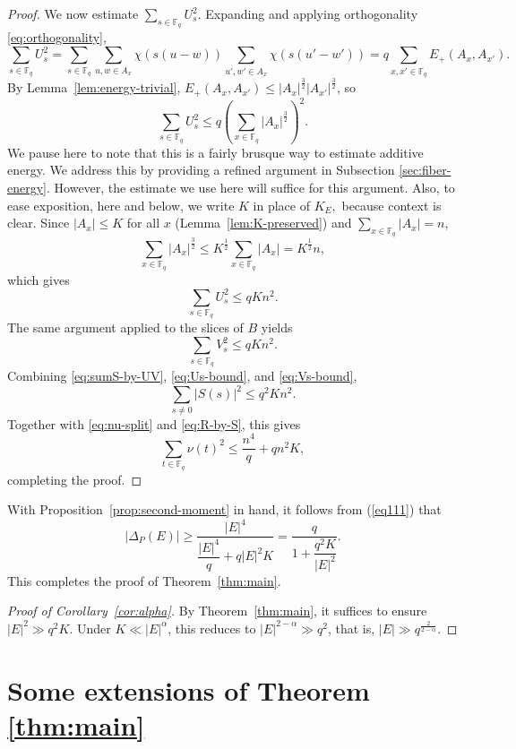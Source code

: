 \documentclass{article}
\newcommand{\F}{\mathbb{F}}
\newcommand{\1}{\mathbf{1}}
\begin{document}
\begin{proof}
We now estimate $\sum\limits_{s\in \F_q} U_s^2$. Expanding and applying orthogonality \eqref{eq:orthogonality},
\[
\sum_{s\in\F_q}U_s^2
=
\sum_{s\in\mathbb F_q}\sum_{u,w\in A_x}\chi(s(u-w))\sum_{u',w'\in A_x}\chi(s(u'-w'))
=
q\sum_{x,x'\in\F_q}E_+(A_x,A_{x'}).
\]
By Lemma~\ref{lem:energy-trivial}, $E_+(A_x,A_{x'})\le|A_x|^{\frac{3}{2}}|A_{x'}|^{\frac{3}{2}}$, so
\[
\sum_{s\in\F_q}U_s^2
\le
q\left(\sum_{x\in\F_q}|A_x|^{\frac{3}{2}}\right)^2.
\]
We pause here to note that this is a fairly brusque way to estimate additive energy. We address this by providing a refined argument in Subsection \ref{sec:fiber-energy}. However, the estimate we use here will suffice for this argument. Also, to ease exposition, here and below, we write $K$ in place of $K_E,$ because context is clear. Since $|A_x|\le K$ for all $x$ (Lemma~\ref{lem:K-preserved}) and $\sum\limits_{x\in\F_q}|A_x|=n$,
\[
\sum_{x\in\F_q}|A_x|^{\frac{3}{2}}\le K^{\frac{1}{2}}\sum_{x\in\F_q}|A_x|=K^{\frac{1}{2}}n,
\]
which gives
\begin{equation}\label{eq:Us-bound}
\sum_{s\in\F_q}U_s^2\le qKn^2.
\end{equation}
The same argument applied to the slices of $B$ yields
\begin{equation}\label{eq:Vs-bound}
\sum_{s\in\F_q}V_s^2\le qKn^2.
\end{equation}
Combining \eqref{eq:sumS-by-UV}, \eqref{eq:Us-bound}, and \eqref{eq:Vs-bound},
\[
\sum_{s\ne 0}|S(s)|^2\le q^2Kn^2.
\]
Together with \eqref{eq:nu-split} and \eqref{eq:R-by-S}, this gives
\[
\sum_{t\in \F_q}\nu(t)^2
\le
\frac{n^4}{q}+qn^2K,
\]
completing the proof.
\end{proof}
With Proposition~\ref{prop:second-moment} in hand, it follows from  (\ref{eq111}) that
\[
|\Delta_P(E)|
\ge
\frac{|E|^4}{\dfrac{|E|^4}{q}+q|E|^2K}
=
\frac{q}{1+\dfrac{q^2K}{|E|^2}}.
\]
This completes the proof of Theorem~\ref{thm:main}.

\begin{proof}[Proof of Corollary~\ref{cor:alpha}]
By Theorem~\ref{thm:main}, it suffices to ensure $|E|^2\gg q^2K$. Under $K\ll|E|^\alpha$, this reduces to $|E|^{2-\alpha}\gg q^2$, that is, $|E|\gg q^{\frac{2}{2-\alpha}}$.
\end{proof}




\section{Some extensions of Theorem \ref{thm:main}}\label{extension-section}
\end{document}

